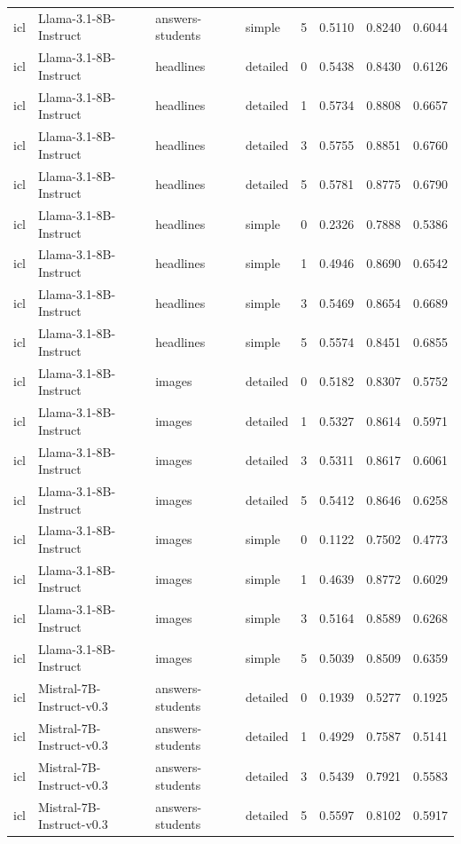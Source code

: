 \begin{longtable}{llllrrrr}
icl & Llama-3.1-8B-Instruct & answers-students & simple & 5 & 0.5110 & 0.8240 & 0.6044 \\
icl & Llama-3.1-8B-Instruct & headlines & detailed & 0 & 0.5438 & 0.8430 & 0.6126 \\
icl & Llama-3.1-8B-Instruct & headlines & detailed & 1 & 0.5734 & 0.8808 & 0.6657 \\
icl & Llama-3.1-8B-Instruct & headlines & detailed & 3 & 0.5755 & 0.8851 & 0.6760 \\
icl & Llama-3.1-8B-Instruct & headlines & detailed & 5 & 0.5781 & 0.8775 & 0.6790 \\
icl & Llama-3.1-8B-Instruct & headlines & simple & 0 & 0.2326 & 0.7888 & 0.5386 \\
icl & Llama-3.1-8B-Instruct & headlines & simple & 1 & 0.4946 & 0.8690 & 0.6542 \\
icl & Llama-3.1-8B-Instruct & headlines & simple & 3 & 0.5469 & 0.8654 & 0.6689 \\
icl & Llama-3.1-8B-Instruct & headlines & simple & 5 & 0.5574 & 0.8451 & 0.6855 \\
icl & Llama-3.1-8B-Instruct & images & detailed & 0 & 0.5182 & 0.8307 & 0.5752 \\
icl & Llama-3.1-8B-Instruct & images & detailed & 1 & 0.5327 & 0.8614 & 0.5971 \\
icl & Llama-3.1-8B-Instruct & images & detailed & 3 & 0.5311 & 0.8617 & 0.6061 \\
icl & Llama-3.1-8B-Instruct & images & detailed & 5 & 0.5412 & 0.8646 & 0.6258 \\
icl & Llama-3.1-8B-Instruct & images & simple & 0 & 0.1122 & 0.7502 & 0.4773 \\
icl & Llama-3.1-8B-Instruct & images & simple & 1 & 0.4639 & 0.8772 & 0.6029 \\
icl & Llama-3.1-8B-Instruct & images & simple & 3 & 0.5164 & 0.8589 & 0.6268 \\
icl & Llama-3.1-8B-Instruct & images & simple & 5 & 0.5039 & 0.8509 & 0.6359 \\
icl & Mistral-7B-Instruct-v0.3 & answers-students & detailed & 0 & 0.1939 & 0.5277 & 0.1925 \\
icl & Mistral-7B-Instruct-v0.3 & answers-students & detailed & 1 & 0.4929 & 0.7587 & 0.5141 \\
icl & Mistral-7B-Instruct-v0.3 & answers-students & detailed & 3 & 0.5439 & 0.7921 & 0.5583 \\
icl & Mistral-7B-Instruct-v0.3 & answers-students & detailed & 5 & 0.5597 & 0.8102 & 0.5917 \\

\end{longtable}

